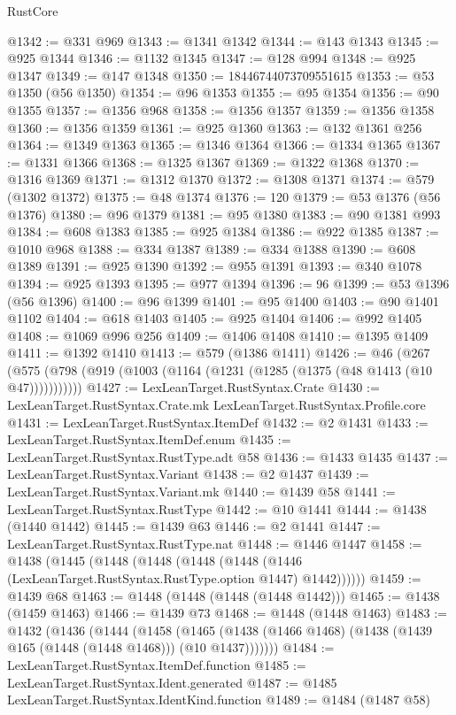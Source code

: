 \begin{lexlean}{RustCore}
\begin{coremodule}
@1342 := @331 @969
@1343 := @1341 @1342
@1344 := @143 @1343
@1345 := @925 @1344
@1346 := @1132 @1345
@1347 := @128 @994
@1348 := @925 @1347
@1349 := @147 @1348
@1350 := 18446744073709551615
@1353 := @53 @1350 (@56 @1350)
@1354 := @96 @1353
@1355 := @95 @1354
@1356 := @90 @1355
@1357 := @1356 @968
@1358 := @1356 @1357
@1359 := @1356 @1358
@1360 := @1356 @1359
@1361 := @925 @1360
@1363 := @132 @1361 @256
@1364 := @1349 @1363
@1365 := @1346 @1364
@1366 := @1334 @1365
@1367 := @1331 @1366
@1368 := @1325 @1367
@1369 := @1322 @1368
@1370 := @1316 @1369
@1371 := @1312 @1370
@1372 := @1308 @1371
@1374 := @579 (@1302 @1372)
@1375 := @48 @1374
@1376 := 120
@1379 := @53 @1376 (@56 @1376)
@1380 := @96 @1379
@1381 := @95 @1380
@1383 := @90 @1381 @993
@1384 := @608 @1383
@1385 := @925 @1384
@1386 := @922 @1385
@1387 := @1010 @968
@1388 := @334 @1387
@1389 := @334 @1388
@1390 := @608 @1389
@1391 := @925 @1390
@1392 := @955 @1391
@1393 := @340 @1078
@1394 := @925 @1393
@1395 := @977 @1394
@1396 := 96
@1399 := @53 @1396 (@56 @1396)
@1400 := @96 @1399
@1401 := @95 @1400
@1403 := @90 @1401 @1102
@1404 := @618 @1403
@1405 := @925 @1404
@1406 := @992 @1405
@1408 := @1069 @996 @256
@1409 := @1406 @1408
@1410 := @1395 @1409
@1411 := @1392 @1410
@1413 := @579 (@1386 @1411)
@1426 := @46
    (@267 (@575 (@798 (@919 (@1003 (@1164 (@1231 (@1285 (@1375 (@48 @1413 (@10 @47)))))))))))
@1427 := LexLeanTarget.RustSyntax.Crate
@1430 := LexLeanTarget.RustSyntax.Crate.mk LexLeanTarget.RustSyntax.Profile.core
@1431 := LexLeanTarget.RustSyntax.ItemDef
@1432 := @2 @1431
@1433 := LexLeanTarget.RustSyntax.ItemDef.enum
@1435 := LexLeanTarget.RustSyntax.RustType.adt @58
@1436 := @1433 @1435
@1437 := LexLeanTarget.RustSyntax.Variant
@1438 := @2 @1437
@1439 := LexLeanTarget.RustSyntax.Variant.mk
@1440 := @1439 @58
@1441 := LexLeanTarget.RustSyntax.RustType
@1442 := @10 @1441
@1444 := @1438 (@1440 @1442)
@1445 := @1439 @63
@1446 := @2 @1441
@1447 := LexLeanTarget.RustSyntax.RustType.nat
@1448 := @1446 @1447
@1458 := @1438
    (@1445
      (@1448
        (@1448 (@1448 (@1448 (@1446 (LexLeanTarget.RustSyntax.RustType.option @1447) @1442))))))
@1459 := @1439 @68
@1463 := @1448 (@1448 (@1448 (@1448 @1442)))
@1465 := @1438 (@1459 @1463)
@1466 := @1439 @73
@1468 := @1448 (@1448 @1463)
@1483 := @1432
    (@1436
      (@1444
        (@1458
          (@1465 (@1438 (@1466 @1468) (@1438 (@1439 @165 (@1448 (@1448 @1468))) (@10 @1437)))))))
@1484 := LexLeanTarget.RustSyntax.ItemDef.function
@1485 := LexLeanTarget.RustSyntax.Ident.generated
@1487 := @1485 LexLeanTarget.RustSyntax.IdentKind.function
@1489 := @1484 (@1487 @58)

\end{coremodule}
\end{lexlean}
